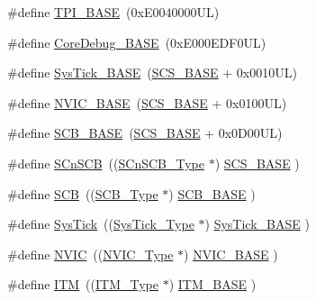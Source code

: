 \begin{DoxyCompactItemize}
\#define \hyperlink{group___c_m_s_i_s__core__base_ga2b1eeff850a7e418844ca847145a1a68}{T\-P\-I\-\_\-\-B\-A\-S\-E}~(0x\-E0040000\-U\-L)
\item 
\#define \hyperlink{group___c_m_s_i_s__core__base_ga680604dbcda9e9b31a1639fcffe5230b}{Core\-Debug\-\_\-\-B\-A\-S\-E}~(0x\-E000\-E\-D\-F0\-U\-L)
\item 
\#define \hyperlink{group___c_m_s_i_s__core__base_ga58effaac0b93006b756d33209e814646}{Sys\-Tick\-\_\-\-B\-A\-S\-E}~(\hyperlink{group___c_m_s_i_s__core__base_ga3c14ed93192c8d9143322bbf77ebf770}{S\-C\-S\-\_\-\-B\-A\-S\-E} +  0x0010\-U\-L)
\item 
\#define \hyperlink{group___c_m_s_i_s__core__base_gaa0288691785a5f868238e0468b39523d}{N\-V\-I\-C\-\_\-\-B\-A\-S\-E}~(\hyperlink{group___c_m_s_i_s__core__base_ga3c14ed93192c8d9143322bbf77ebf770}{S\-C\-S\-\_\-\-B\-A\-S\-E} +  0x0100\-U\-L)
\item 
\#define \hyperlink{group___c_m_s_i_s__core__base_gad55a7ddb8d4b2398b0c1cfec76c0d9fd}{S\-C\-B\-\_\-\-B\-A\-S\-E}~(\hyperlink{group___c_m_s_i_s__core__base_ga3c14ed93192c8d9143322bbf77ebf770}{S\-C\-S\-\_\-\-B\-A\-S\-E} +  0x0\-D00\-U\-L)
\item 
\#define \hyperlink{group___c_m_s_i_s__core__base_ga9fe0cd2eef83a8adad94490d9ecca63f}{S\-Cn\-S\-C\-B}~((\hyperlink{struct_s_cn_s_c_b___type}{S\-Cn\-S\-C\-B\-\_\-\-Type}    $\ast$)     \hyperlink{group___c_m_s_i_s__core__base_ga3c14ed93192c8d9143322bbf77ebf770}{S\-C\-S\-\_\-\-B\-A\-S\-E}      )
\item 
\#define \hyperlink{group___c_m_s_i_s__core__base_gaaaf6477c2bde2f00f99e3c2fd1060b01}{S\-C\-B}~((\hyperlink{struct_s_c_b___type}{S\-C\-B\-\_\-\-Type}       $\ast$)     \hyperlink{group___c_m_s_i_s__core__base_gad55a7ddb8d4b2398b0c1cfec76c0d9fd}{S\-C\-B\-\_\-\-B\-A\-S\-E}      )
\item 
\#define \hyperlink{group___c_m_s_i_s__core__base_gacd96c53beeaff8f603fcda425eb295de}{Sys\-Tick}~((\hyperlink{struct_sys_tick___type}{Sys\-Tick\-\_\-\-Type}   $\ast$)     \hyperlink{group___c_m_s_i_s__core__base_ga58effaac0b93006b756d33209e814646}{Sys\-Tick\-\_\-\-B\-A\-S\-E}  )
\item 
\#define \hyperlink{group___c_m_s_i_s__core__base_gac8e97e8ce56ae9f57da1363a937f8a17}{N\-V\-I\-C}~((\hyperlink{struct_n_v_i_c___type}{N\-V\-I\-C\-\_\-\-Type}      $\ast$)     \hyperlink{group___c_m_s_i_s__core__base_gaa0288691785a5f868238e0468b39523d}{N\-V\-I\-C\-\_\-\-B\-A\-S\-E}     )
\item 
\#define \hyperlink{group___c_m_s_i_s__core__base_gabae7cdf882def602cb787bb039ff6a43}{I\-T\-M}~((\hyperlink{struct_i_t_m___type}{I\-T\-M\-\_\-\-Type}       $\ast$)     \hyperlink{group___c_m_s_i_s__core__base_gadd76251e412a195ec0a8f47227a8359e}{I\-T\-M\-\_\-\-B\-A\-S\-E}      )

\end{DoxyCompactItemize}
